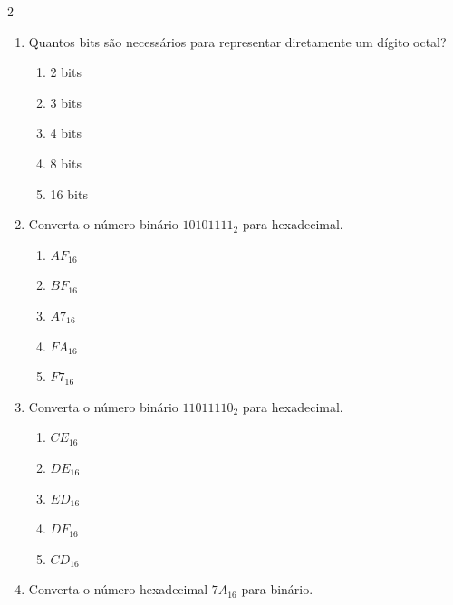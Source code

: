 \documentclass[a4paper,12pt]{article}
\begin{document}
\begin{multicols}{2}
\begin{enumerate}[leftmargin=*]
\vspace{0.2cm}


\item Quantos bits são necessários para representar diretamente um dígito octal?

\begin{enumerate}[label=(\Alph*)]
    \item 2 bits
    \item 3 bits
    \item 4 bits
    \item 8 bits
    \item 16 bits
\end{enumerate}

\vspace{0.2cm}


\item Converta o número binário $10101111_2$ para hexadecimal.

\begin{enumerate}[label=(\Alph*)]
    \item $AF_{16}$
    \item $BF_{16}$
    \item $A7_{16}$
    \item $FA_{16}$
    \item $F7_{16}$
\end{enumerate}

\vspace{0.2cm}

\item Converta o número binário $11011110_2$ para hexadecimal.

\begin{enumerate}[label=(\Alph*)]
    \item $CE_{16}$
    \item $DE_{16}$
    \item $ED_{16}$
    \item $DF_{16}$
    \item $CD_{16}$
\end{enumerate}

\vspace{0.2cm}

\item Converta o número hexadecimal $7A_{16}$ para binário.


\end{enumerate}
\end{multicols}
\end{document}
